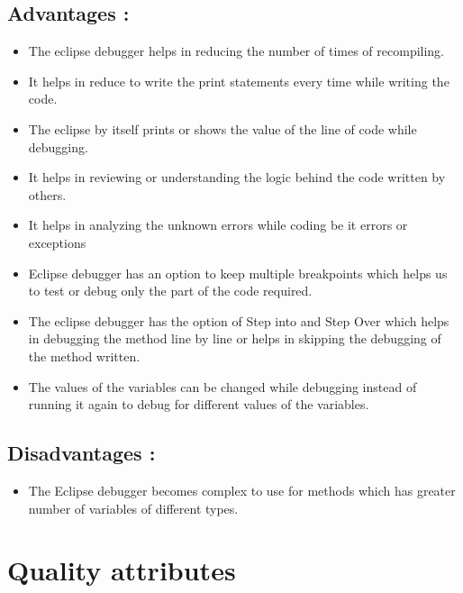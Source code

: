 \documentclass[12pt]{report}
\begin{document}
\subsection{Advantages :}
\begin{itemize}
    \item The eclipse debugger helps in reducing the number of times of recompiling.
    \item It helps in reduce to write the print statements every time while writing the code.
    \item The eclipse by itself prints or shows the value of the line of code while debugging.
    \item It helps in reviewing or understanding the logic behind the code written by others.
    \item It helps in analyzing the unknown errors while coding be it errors or exceptions
    \item Eclipse debugger has an option to keep multiple breakpoints which helps us to test or debug only the part of the code required.
    \item The eclipse debugger has the option of Step into and Step Over which helps in debugging the method line by line or helps in skipping the debugging of the method written.
    \item The values of the variables can be changed while debugging instead of running it again to debug for different values of the variables.
\end{itemize}

\subsection{Disadvantages :}
\begin{itemize}
    \item The Eclipse debugger becomes complex to use for methods which has greater number of variables of different types.
\end{itemize}

\newpage

\section{Quality attributes}
\end{document}
